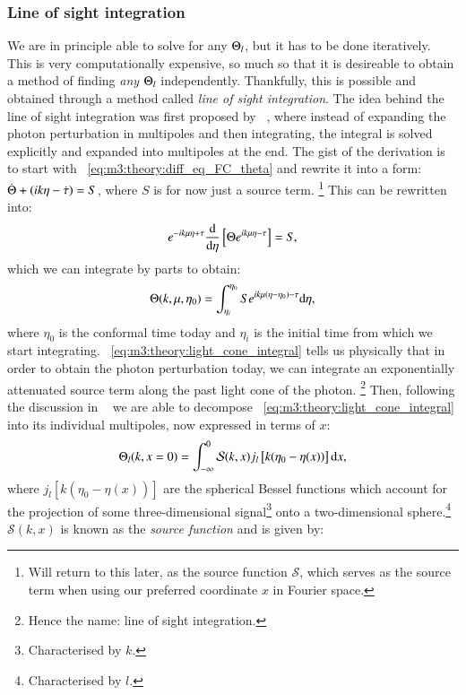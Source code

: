 \subsubsection{Line of sight integration}\label{sec:m3:theory:line_of_sight}
    We are in principle able to solve for any $\Theta_l$, but it has to be done iteratively. This is very computationally expensive, so much so that it is desireable to obtain a method of finding \textit{any} $\Theta_l$ independently. Thankfully, this is possible and obtained through a method called \textit{line of sight integration}. The idea behind the line of sight integration was first proposed by ~\cite{Seljak_1996}, where instead of expanding the photon perturbation in multipoles and then integrating, the integral is solved explicitly and expanded into multipoles at the end. The gist of the derivation is to start with ~\cref{eq:m3:theory:diff_eq_FC_theta} and rewrite it into a form: $\dot{\Theta}+(ik\eta-\dot{\tau}) = S$, where $S$ is for now just a source term. \footnote{Will return to this later, as the source function $\mathcal{S}$, which serves as the source term when using our preferred coordinate $x$ in Fourier space.} This can be rewritten into:
    \begin{equation}
        e^{-ik\mu\eta+\tau}\dv{}{\eta}\left[\Theta e^{ik\mu\eta-\tau}\right] = S,
    \end{equation} 
    which we can integrate by parts to obtain:
    \begin{equation}\label{eq:m3:theory:light_cone_integral}
        \Theta(k,\mu,\eta_0) = \int_{\eta_i}^{\eta_0} S e^{ik\mu(\eta-\eta_0)-\tau}\mathrm{d}\eta,
    \end{equation}
    where $\eta_0$ is the conformal time today and $\eta_i$ is the initial time from which we start integrating. ~\cref{eq:m3:theory:light_cone_integral} tells us physically that in order to obtain the photon perturbation today, we can integrate an exponentially attenuated source term along the past light cone of the photon. \footnote{Hence the name: line of sight integration.} Then, following the discussion in ~\cite[Eq. 9.49 - Eq. 9.54]{dodelson2020modern} we are able to decompose ~\cref{eq:m3:theory:light_cone_integral} into its individual multipoles, now expressed in terms of $x$:
    \begin{equation}\label{eq:m3:theory:line_of_sight_integral_definition}
        \Theta_l(k,x=0) = \int_{-\infty}^0 \mathcal{S}(k,x)j_l\left[k(\eta_0-\eta(x))\right]\mathrm{d} x,
    \end{equation}
    where $j_l\left[k(\eta_0-\eta(x))\right]$ are the spherical Bessel functions which account for the projection of some three-dimensional signal\footnote{Characterised by $k$.} onto a two-dimensional sphere.\footnote{Characterised by $l$.} $\mathcal{S}(k,x)$ is known as the \textit{source function} and is given by:
